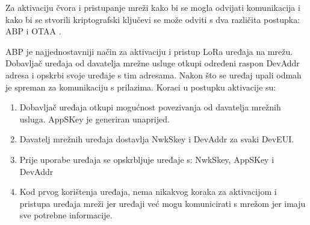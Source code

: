 \documentclass[times, utf8, diplomski]{fer}
\begin{document}
Za aktivaciju čvora i pristupanje mreži kako bi se mogla odvijati komunikacija i kako bi se stvorili kriptografski ključevi se može odviti s dva različita postupka: ABP  i OTAA .

ABP je najjednostavniji način za aktivaciju i pristup LoRa uređaja na mrežu. Dobavljač uređaja od davatelja mrežne usluge otkupi određeni raspon DevAddr adresa i opskrbi svoje uređaje s tim adresama. Nakon što se uređaj upali odmah je spreman za komunikaciju s prilazima. Koraci u postupku aktivacije su:
\begin{enumerate}
    \item Dobavljač uređaja otkupi mogućnost povezivanja od davatelja mrežnih usluga. AppSKey je generiran unaprijed.
    \item Davatelj mrežnih uređaja dostavlja NwkSkey i DevAddr za svaki DevEUI.
    \item Prije uporabe uređaja se opskrbljuje uređaje s: NwkSkey, AppSKey i DevAddr
    \item Kod prvog korištenja uređaja, nema nikakvog koraka za aktivacijom i pristupa uređaja mreži jer uređaji već mogu komunicirati s mrežom jer imaju sve potrebne informacije.
\end{enumerate}
\end{document}
